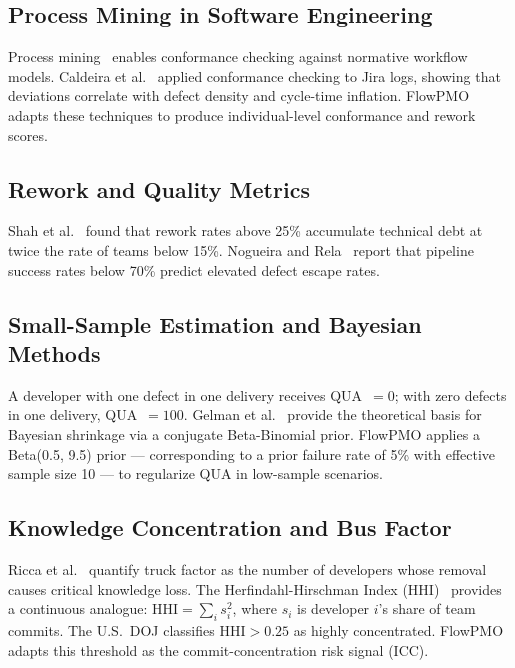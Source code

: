 \documentclass[conference]{IEEEtran}
\begin{document}
\subsection{Process Mining in Software Engineering}

Process mining~\cite{vanderaalst2016} enables conformance checking against
normative workflow models. Caldeira et al.~\cite{caldeira2019} applied conformance
checking to Jira logs, showing that deviations correlate with defect density and
cycle-time inflation. FlowPMO adapts these techniques to produce individual-level
conformance and rework scores.

\subsection{Rework and Quality Metrics}

Shah et al.~\cite{shah2023} found that rework rates above 25\% accumulate
technical debt at twice the rate of teams below 15\%. Nogueira and
Rela~\cite{nogueira2023} report that pipeline success rates below 70\% predict
elevated defect escape rates.

\subsection{Small-Sample Estimation and Bayesian Methods}

A developer with one defect in one delivery receives QUA~$=0$; with zero defects in
one delivery, QUA~$=100$. Gelman et al.~\cite{gelman2013} provide the theoretical
basis for Bayesian shrinkage via a conjugate Beta-Binomial prior. FlowPMO applies
a Beta(0.5, 9.5) prior --- corresponding to a prior failure rate of 5\% with
effective sample size 10 --- to regularize QUA in low-sample scenarios.

\subsection{Knowledge Concentration and Bus Factor}

Ricca et al.~\cite{ricca2019} quantify truck factor as the number of developers
whose removal causes critical knowledge loss. The Herfindahl-Hirschman Index
(HHI)~\cite{doj2010} provides a continuous analogue:
$\text{HHI} = \sum_i s_i^2$, where $s_i$ is developer $i$'s share of team
commits. The U.S.~DOJ classifies $\text{HHI} > 0.25$ as highly concentrated.
FlowPMO adapts this threshold as the commit-concentration risk signal (ICC).
\end{document}
